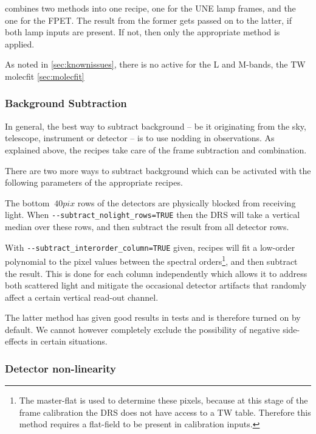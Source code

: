 combines two methods into one recipe, one
for the UNE lamp frames, and the one for the FPET. The result from the former
gets passed on to the latter, if both lamp inputs are present. If not, then only
the appropriate method is applied. 

As noted in \ref{sec:knownissues}, there is no active 
for the L and M-bands, the TW
molecfit
\ref{sec:molecfit}


\subsubsection{Background Subtraction}
\label{sec:backgr}

In general, the best way to subtract background  --  be it originating from the
sky, telescope, instrument or detector  --  is to use nodding in observations.
As explained above, the recipes take care of the frame subtraction and
combination.

There are two more ways to subtract background which can be activated with the
following parameters of the appropriate recipes.

The bottom $~40pix$ rows of the detectors are physically blocked from receiving
light. When \linebreak\verb!--subtract_nolight_rows=TRUE! then the DRS will take a
vertical median over these rows, and then subtract the result from all detector
rows.

With \verb!--subtract_interorder_column=TRUE! given, recipes will fit a
low-order polynomial to the pixel values between the spectral
orders\footnote{The master-flat is used to determine these pixels, because at
this stage of the frame calibration the DRS does not have access to a TW table.
Therefore this method requires a flat-field to be present in calibration
inputs.}, and then subtract the result. This is done for each column
independently which allows it to address both scattered light and mitigate the
occasional detector artifacts that randomly affect a certain vertical read-out
channel.

The latter method has given good results in tests and is therefore turned on by
default. We cannot however completely exclude the possibility of negative
side-effects in certain situations.

\subsubsection{Detector non-linearity}
\label{sec:detlin}

